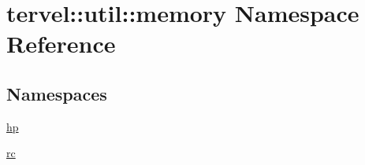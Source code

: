 \hypertarget{namespacetervel_1_1util_1_1memory}{}\section{tervel\+:\+:util\+:\+:memory Namespace Reference}
\label{namespacetervel_1_1util_1_1memory}
\subsection*{Namespaces}
\begin{DoxyCompactItemize}
\item 
 \hyperlink{namespacetervel_1_1util_1_1memory_1_1hp}{hp}
\item 
 \hyperlink{namespacetervel_1_1util_1_1memory_1_1rc}{rc}
\end{DoxyCompactItemize}
